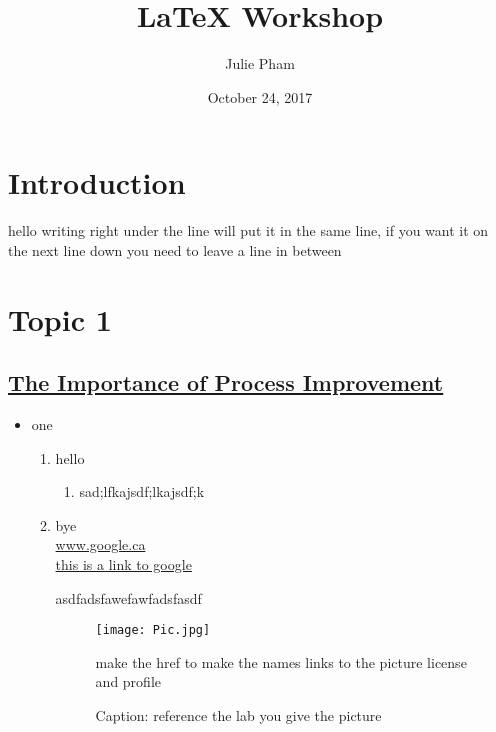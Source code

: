 \documentclass[12pt]{article}
\title{LaTeX Workshop}
\author{Julie Pham }
\date{October 24, 2017}
\begin{document}
\maketitle

\section{Introduction}
hello
writing right under the line will put it in the same line, if you want it on the next line down you need to leave a line in between\\

\section{Topic 1}

\subsection{\underline{The Importance of Process Improvement}}


\begin{itemize}
    \item one

\begin{enumerate}
    \item hello
        \begin{enumerate}
            \item sad;lfkajsdf;lkajsdf;k
        \end{enumerate}
    \item bye\\
    
\url{www.google.ca}\\
\href{www.google.ca}{this is a link to google}

asdfadsfawefawfadsfasdf


\begin{figure}
    \centering
    \texttt{[image: Pic.jpg]}
    \caption{Caption: reference the lab you give the picture}
    \label{fig:my_label}
    
make the href to make the names links to the picture license and profile



\end{figure}

\end{enumerate}
    
\end{itemize}
\end{document}
